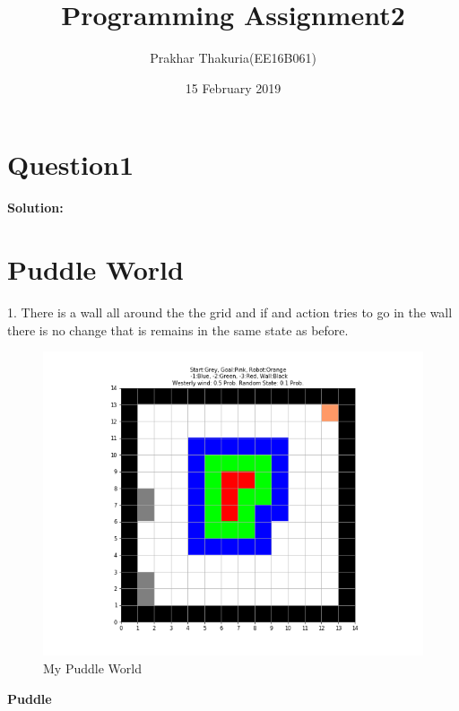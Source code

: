 \documentclass[12pt, letterpaper, twoside]{report}
\title{Programming Assignment2 }
\author{Prakhar Thakuria(EE16B061)}
\date { 15 February 2019}
\begin{document}
\maketitle
\section*{Question1}
\textbf{Solution:} \par
\section*{Puddle World}
1. There is a wall all around the the grid and if and action tries to go in the wall there is no change that is remains in the same state as before. 
 \begin{figure}[h!]
  \centering
    \includegraphics[width=0.8\linewidth]{Puddle.png}
  \caption{My Puddle World}
\end{figure}
 \newpage
 \textbf{Puddle}
\par
\end{document}
